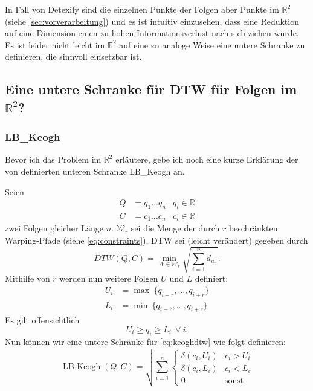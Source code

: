 
In Fall von Detexify sind die einzelnen Punkte der Folgen aber Punkte im \( \mathbb{R}^2 \) (siehe \ref{sec:vorverarbeitung}) und es ist intuitiv einzusehen, dass eine Reduktion auf eine Dimension einen zu hohen Informationsverlust nach sich ziehen würde. Es ist leider nicht leicht im  \( \mathbb{R}^2 \) auf eine zu \cite{Keogh:2005p7751} analoge Weise eine untere Schranke zu definieren, die sinnvoll einsetzbar ist.

\subsection{Eine untere Schranke für DTW für Folgen im \( \mathbb{R}^2 \)?}

\subsubsection{LB\_Keogh}
\label{ssub:lb_keogh}

Bevor ich das Problem im \( \mathbb{R}^2 \) erläutere, gebe ich noch eine kurze Erklärung der von \citet{Keogh:2005p7751} definierten unteren Schranke LB\_Keogh an.

Seien
\begin{align}
  Q &= q_1 \dots q_n  & q_i \in \mathbb{R} \\
  C &= c_1 \dots c_n  & c_i \in \mathbb{R}
\end{align}
zwei Folgen gleicher Länge $n$. \( \mathcal{W}_r \) sei die Menge der durch \(r\) beschränkten Warping-Pfade (siehe \ref{eq:constraints}). DTW sei (leicht verändert) gegeben durch
\begin{equation}
  \label{eq:keoghdtw}
  DTW(Q,C) = \min_{W \in \mathcal{W}_r}{\sqrt{\sum_{i=1}^n d_{w_i}}} .
\end{equation}
Mithilfe von \(r\) werden nun weitere Folgen $U$ und $L$ definiert:
\begin{align}
  U_i &= \max ~\{ q_{i-r}, \dots, q_{i+r} \}\\
  L_i &= \min ~\{ q_{i-r}, \dots, q_{i+r} \}
\end{align}
Es gilt offensichtlich
\begin{equation}
  U_i \geq q_i \geq L_i ~~ \forall ~ i.
\end{equation}
Nun können wir eine untere Schranke für \ref{eq:keoghdtw} wie folgt definieren:
\begin{equation}
  \label{eq:lbkeogh}
  \operatorname{LB\_Keogh}(Q,C) = \sqrt{\sum_{i=1}^n
  \begin{cases}
    \delta(c_i, U_i) & c_i > U_i \\
    \delta(c_i, L_i) & c_i < L_i \\
    0 & \text{sonst}
  \end{cases}
  }
\end{equation}

